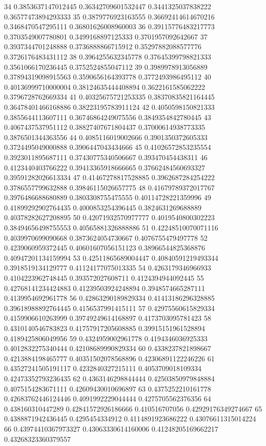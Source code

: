34 0.3853637147012445 0.36342709601532447 0.3441325037838222 0.36577473894293333
35 0.3879776923163555 0.36692414614670216 0.3468470547295111 0.36801626008960003
36 0.39115776483217773 0.3703549007780801 0.3499168897125333 0.3701957092642667
37 0.3937344701248888 0.3736888866715912 0.35297882088577776 0.3726176483431112
38 0.3964255632345778 0.37645399798821333 0.3561066170236445 0.3752524855047112
39 0.3989978913056889 0.37894319098915563 0.3590656164393778 0.3772493986495112
40 0.40136999710000004 0.38124635444408894 0.3622161585062222 0.3796728762669334
41 0.40325675721253335 0.38370835821164445 0.36478401466168886 0.38223195783911124
42 0.4050598150821333 0.3855644113607111 0.36746864249075556 0.3849354842780445
43 0.4067437537951112 0.38827407671804437 0.37000614938773335 0.3876501344363556
44 0.4085116019002666 0.3901350372605333 0.3724495049000888 0.3906447043434666
45 0.41026572853235554 0.3923011895687111 0.37430775340506667 0.393470454438311
46 0.4123440403766222 0.39413365918666665 0.37662484560693327 0.39591282026613334
47 0.41467278817528885 0.3962687284254222 0.3786557799632888 0.39846115026657775
48 0.41679789372017767 0.3976486688680889 0.3803308755475555 0.40114728221359996
49 0.41899292902764435 0.4000853254396445 0.3824631269688889 0.40378282627208895
50 0.42071932570977777 0.4019540800302223 0.38494656498755553 0.40565881326888886
51 0.42248510070071116 0.4039970699090668 0.3873624054730667 0.4076755479497778
52 0.4239060959372445 0.40601607056151123 0.38966544825368876 0.40947201134159994
53 0.42511865689004447 0.40840591219493344 0.3918519134129777 0.41124177075013335
54 0.4263179346966933 0.4104223962748445 0.393572027608711 0.4124394944092445
55 0.42768141234424883 0.41239503924248894 0.3948574665287111 0.4139954692961778
56 0.42863290189829334 0.41413186296328885 0.39618988892764445 0.4156537991415111
57 0.42975560615829334 0.4159906610263999 0.39749249614168897 0.4173703095781423
58 0.4310140546783823 0.41757917205608885 0.39915151961528894 0.4189425806049956
59 0.4324959002961778 0.4194346036925333 0.4012832275340444 0.42108689990829334
60 0.4338237821898667 0.4213884198465777 0.40351502078568896 0.42306891122246226
61 0.43527241505191117 0.4232840327215111 0.4053709018109334 0.42473352793236435
62 0.4363146298844444 0.42503850979848884 0.4075154283671111 0.42609430010696897
63 0.4375252210161778 0.42683762446124446 0.4091992229044444 0.4275705562376356
64 0.438160310447289 0.42841572926186666 0.410516707056 0.42929176349274667
65 0.4388871942436445 0.4295454334912 0.4114891923686222 0.43076611315014224
66 0.43974410367973327 0.43063330614160006 0.41248205169662217 0.43268323360379557
